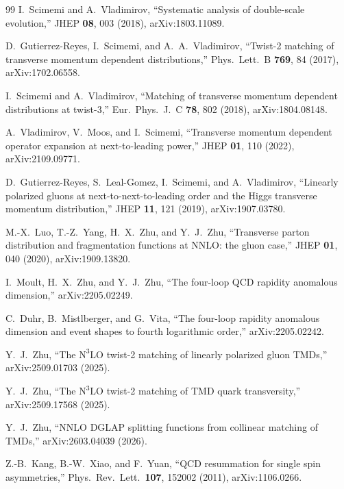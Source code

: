 \documentclass[11pt]{article}
\begin{document}
\begin{thebibliography}{99}
I.~Scimemi and A.~Vladimirov,
``Systematic analysis of double-scale evolution,''
JHEP \textbf{08}, 003 (2018), arXiv:1803.11089.

D.~Gutierrez-Reyes, I.~Scimemi, and A.~A.~Vladimirov,
``Twist-2 matching of transverse momentum dependent distributions,''
Phys.\ Lett.\ B \textbf{769}, 84 (2017), arXiv:1702.06558.

I.~Scimemi and A.~Vladimirov,
``Matching of transverse momentum dependent distributions at twist-3,''
Eur.\ Phys.\ J.\ C \textbf{78}, 802 (2018), arXiv:1804.08148.

A.~Vladimirov, V.~Moos, and I.~Scimemi,
``Transverse momentum dependent operator expansion at next-to-leading power,''
JHEP \textbf{01}, 110 (2022), arXiv:2109.09771.

D.~Gutierrez-Reyes, S.~Leal-Gomez, I.~Scimemi, and A.~Vladimirov,
``Linearly polarized gluons at next-to-next-to-leading order and the Higgs
transverse momentum distribution,''
JHEP \textbf{11}, 121 (2019), arXiv:1907.03780.

M.-X.~Luo, T.-Z.~Yang, H.~X.~Zhu, and Y.~J.~Zhu,
``Transverse parton distribution and fragmentation functions at NNLO: the
gluon case,''
JHEP \textbf{01}, 040 (2020), arXiv:1909.13820.

I.~Moult, H.~X.~Zhu, and Y.~J.~Zhu,
``The four-loop QCD rapidity anomalous dimension,''
arXiv:2205.02249.

C.~Duhr, B.~Mistlberger, and G.~Vita,
``The four-loop rapidity anomalous dimension and event shapes to fourth
logarithmic order,''
arXiv:2205.02242.

Y.~J.~Zhu,
``The \(\mathrm{N}^3\mathrm{LO}\) twist-2 matching of linearly polarized gluon
TMDs,''
arXiv:2509.01703 (2025).

Y.~J.~Zhu,
``The \(\mathrm{N}^3\mathrm{LO}\) twist-2 matching of TMD quark transversity,''
arXiv:2509.17568 (2025).

Y.~J.~Zhu,
``NNLO DGLAP splitting functions from collinear matching of TMDs,''
arXiv:2603.04039 (2026).

Z.-B.~Kang, B.-W.~Xiao, and F.~Yuan,
``QCD resummation for single spin asymmetries,''
Phys.\ Rev.\ Lett.\ \textbf{107}, 152002 (2011), arXiv:1106.0266.


\end{thebibliography}
\end{document}
